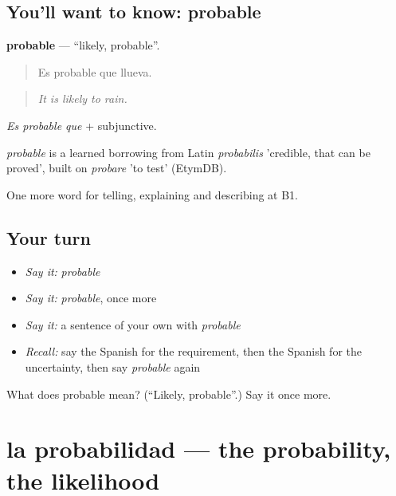 \subsection*{You'll want to know: probable}
\textbf{probable} — \textquotedblleft{}likely, probable\textquotedblright{}.

\begin{quote}
Es probable que llueva.
\end{quote}

\begin{quote}
\emph{It is likely to rain.}
\end{quote}

\emph{Es probable que} + subjunctive.

\begin{cousinweb}
\emph{probable} is a learned borrowing from Latin \emph{probabilis} 'credible, that can be proved', built on \emph{probare} 'to test' (EtymDB).
\end{cousinweb}

\begin{grammarlens}[title={What you've built}]
One more word for telling, explaining and describing at B1.
\end{grammarlens}

\subsection*{Your turn}
\begin{itemize}
\raggedright
  \item \emph{Say it:} \emph{probable}
  \item \emph{Say it:} \emph{probable}, once more
  \item \emph{Say it:} a sentence of your own with \emph{probable}
  \item \emph{Recall:} say the Spanish for the requirement, then the Spanish for the uncertainty, then say \emph{probable} again
\end{itemize}

\begin{tcolorbox}[breakable,colback=teal!4,colframe=teal!35!black,title={Before you move on}]
What does probable mean? (\textquotedblleft{}Likely, probable\textquotedblright{}.) Say it once more.
\end{tcolorbox}
\section[la probabilidad]{la probabilidad — the probability, the likelihood}


